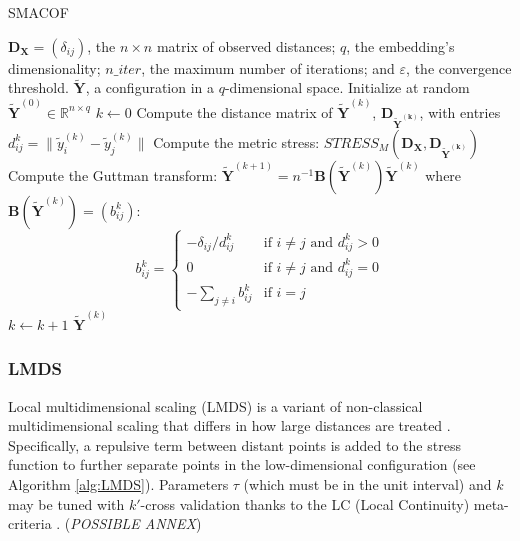 \begin{algorithm}[ht]
    \caption{SMACOF}
    \label{alg:SMACOF}
    
    \begin{algorithmic}[1]
    \REQUIRE $\mathbf{D}_{\boldsymbol{\mathbf{X}}} = (\delta_{ij})$, the $n\times n$ matrix of observed distances; $q$, the embedding's dimensionality; $n\_iter$, the maximum number of iterations; and $\varepsilon$, the convergence threshold.
    \ENSURE $\boldsymbol{\mathbf{\tilde{Y}}}$, a configuration in a $q$-dimensional space.
    \STATE Initialize at random $\boldsymbol{\mathbf{\tilde{Y}}}^{(0)} \in \mathbb{R}^{n \times q}$
    \STATE $k \leftarrow 0$
    \REPEAT
        \STATE Compute the distance matrix of $\boldsymbol{\mathbf{\tilde{Y}}}^{(k)}$, $\mathbf{D}_{\boldsymbol{\mathbf{\tilde{Y}}^{(k)}}}$, with entries $d_{ij}^k = \|\tilde{y}_i^{(k)} - \tilde{y}_j^{(k)}\|$
        \STATE Compute the metric stress: $STRESS_M( \mathbf{D}_{\mathbf{X}}, \mathbf{D}_{\boldsymbol{\mathbf{\tilde{Y}}^{(k)}}} )$
        \STATE Compute the Guttman transform: $\boldsymbol{\mathbf{\tilde{Y}}}^{(k+1)} = n^{-1}\mathbf{B}(\boldsymbol{\mathbf{\tilde{Y}}}^{(k)})\boldsymbol{\mathbf{\tilde{Y}}}^{(k)}$ where $\mathbf{B}(\boldsymbol{\mathbf{\tilde{Y}}}^{(k)}) = (b_{ij}^k)$:
        $$
        b_{ij}^k =
        \begin{cases}
        -\delta_{ij}/d_{ij}^k & \text{if } i \neq j \text{ and } d_{ij}^k > 0 \\
        0 & \text{if } i \neq j \text{ and } d_{ij}^k = 0 \\
        -\sum_{j \neq i} b_{ij}^k & \text{if } i = j
        \end{cases}
        $$
        \STATE $k \leftarrow k + 1$
    \RETURN $\boldsymbol{\mathbf{\tilde{Y}}}^{(k)}$
    \end{algorithmic}
\end{algorithm}

\subsubsection{LMDS}

Local multidimensional scaling (LMDS) is a variant of non-classical multidimensional scaling that differs in how large distances are treated \citep{Chen2009}. Specifically, a repulsive term between distant points is added to the stress function to further separate points in the low-dimensional configuration (see Algorithm \ref{alg:LMDS}). Parameters $\tau$ (which must be in the unit interval) and $k$ may be tuned with $k'$-cross validation thanks to the LC (Local Continuity) meta-criteria \citep{Chen2009}. (\textit{POSSIBLE ANNEX})


